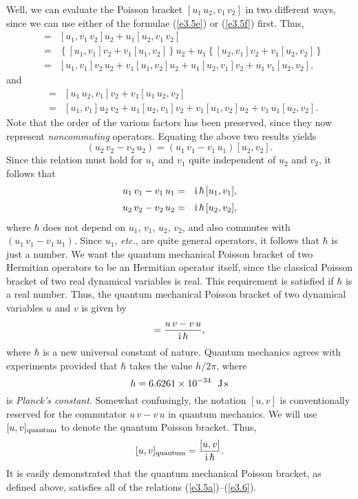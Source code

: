 Well, we can evaluate the Poisson bracket $[u_1 \,u_2, v_1 \,v_2]$ in
two different ways, since we can use either of the formulae (\ref{e3.5e}) or
(\ref{e3.5f}) first. Thus,
\begin{eqnarray}
[u_1\, u_2, v_1\, v_2] &=& [u_1, v_1 \,v_2]u_2 + u_1[u_2, v_1\, v_2]\\[0.5ex]
&=& \left\{ [u_1, v_1]v_2 + v_1[u_1, v_2]\right\} u_2 
+u_1\left\{[u_2, v_1]v_2 + v_1[u_2, v_2]\right\}\nonumber\\[0.5ex]
&=& [u_1, v_1] v_2 \,u_2 + v_1[u_1, v_2] u_2 + u_1[u_2, v_1]v_2
+ u_1 \,v_1[u_2, v_2],\nonumber
\end{eqnarray}
and
\begin{eqnarray}
[u_1 \,u_2, v_1\, v_2] &=& [u_1 \,u_2, v_1 ]v_2 + v_1[u_1\, u_2, v_2]\\[0.5ex]
&=& [u_1, v_1] u_2 \,v_2 + u_1[u_2, v_1] v_2 + v_1[u_1, v_2]u_2
+ v_1\, u_1[u_2, v_2].\nonumber
\end{eqnarray}
Note that the order of the various factors has been preserved, since they
now represent {\em noncommuting} operators. Equating the above two results
yields
\begin{equation}
[u_1, v_1] (u_2 \,v_2 - v_2 \,u_2) = (u_1 \,v_1-v_1\, u_1)[u_2, v_2].
\end{equation}
Since this relation must hold for $u_1$ and $v_1$ quite independent of
$u_2$ and $v_2$, it follows that
\begin{eqnarray}
u_1 \,v_1 - v_1\, u_1 &=& {\rm i}\,\hbar \,[u_1, v_1],\\[0.5ex]
u_2\, v_2 - v_2\, u_2 &=& {\rm i} \,\hbar \,[u_2, v_2],
\end{eqnarray}
where $\hbar$ does not depend on $u_1$, $v_1$, $u_2$, $v_2$, and also
commutes with $(u_1\, v_1- v_1 \,u_1)$. Since $u_1$, {\em etc.}, are quite general
operators, it follows that $\hbar$ is just a number. We want the quantum 
mechanical Poisson
bracket of two Hermitian operators to be an Hermitian operator itself, since
the classical Poisson bracket of two real dynamical variables is real. This
requirement is satisfied if $\hbar$ is a real number. Thus, the
quantum mechanical Poisson bracket of two dynamical variables $u$ and $v$
is given by
\begin{equation}
[u, v] = \frac{u\,v - v\,u}{{\rm i} \,\hbar},
\end{equation}
where $\hbar$ is a new universal constant of nature. Quantum mechanics agrees with
experiments provided that  $\hbar$ takes the value $h/2\pi$, where
\begin{equation}
h = 6.6261 \times 10^{-34}~~{\rm J\,s}
\end{equation}
is {\em Planck's constant}. Somewhat confusingly, the notation
$[u, v]$ is
conventionally  reserved for the commutator $u\,v-v\,u$ in quantum mechanics. 
We will use $[u, v]_{\rm quantum}$ to denote the quantum Poisson bracket. 
Thus,
\begin{equation}\label{e3.13}
[u, v]_{\rm quantum} = \frac{[u, v]}{{\rm i}\, \hbar}.
\end{equation}
It is easily demonstrated that the quantum mechanical Poisson bracket, as defined above,
satisfies all of the relations (\ref{e3.5a})--(\ref{e3.6}).

